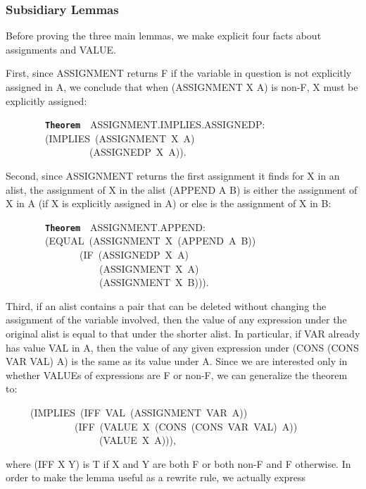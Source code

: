 \documentclass[11pt]{book}
\newenvironment{pubasis}{\begin{flushleft}\ttfamily\small}{\normalsize\rmfamily\end{flushleft}}
\newcommand{\axiomordefinition}[1]{\vspace{6pt}\texttt{\textbf{#1}}}
\newcommand{\pubdefaulttextsize}{\large}
\begin{document}
\subsubsection{Subsidiary Lemmas}
\pubdefaulttextsize
Before proving the three main lemmas, we make explicit four facts
about assignments and VALUE.

First, since ASSIGNMENT returns F if the variable in question is not explicitly
assigned in A, we conclude that when (ASSIGNMENT X A) is non-F,
X must be explicitly assigned:
\begin{pubasis}
~~~~~~~~\axiomordefinition{Theorem}~~ASSIGN\-MENT.IMPLIES.ASSIGNEDP:\\
~~~~~~~~(IMPLIES~(ASSIGNMENT~X~A)\\
~~~~~~~~~~~~~~~~~(ASSIGNEDP~X~A)).\\
\end{pubasis}
Second, since ASSIGNMENT returns the first assignment it finds for
X in an alist, the assignment of X in the alist (APPEND A B) is either the
assignment of X in A (if X is explicitly assigned in A) or
else is the assignment of X in B:
\begin{pubasis}
~~~~~~~~\axiomordefinition{Theorem}~~ASSIGN\-MENT.APPEND:\\
~~~~~~~~(EQUAL~(ASSIGNMENT~X~(APPEND~A~B))\\
~~~~~~~~~~~~~~~(IF~(ASSIGNEDP~X~A)\\
~~~~~~~~~~~~~~~~~~~(ASSIGNMENT~X~A)\\
~~~~~~~~~~~~~~~~~~~(ASSIGNMENT~X~B))).\\
\end{pubasis}
Third, if an alist contains a pair that can be deleted without changing
the assignment of the variable involved, then the value of any
expression under the original alist is equal to that under the shorter
alist.  In particular, if VAR already has value VAL in A, then
the value of any given expression under (CONS (CONS VAR VAL) A) is the same as its value
under A.
Since we are  interested only in whether VALUEs of expressions
are F or non-F, we can generalize the theorem to:
\begin{pubasis}
~~~~~(IMPLIES~(IFF~VAL~(ASSIGNMENT~VAR~A))\\
~~~~~~~~~~~~~~(IFF~(VALUE~X~(CONS~(CONS~VAR~VAL)~A))\\
~~~~~~~~~~~~~~~~~~~(VALUE~X~A))),\\
\end{pubasis}
where (IFF X Y) is T if X and Y are both F or both non-F and F otherwise.
In order to make the lemma useful as a rewrite rule, we actually express
\end{document}
